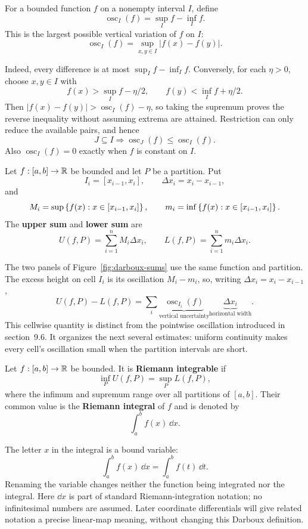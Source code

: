 \begin{definition}
For a bounded function $f$ on a nonempty interval $I$, define
\[
\operatorname{osc}_I(f)=\sup_I f-\inf_I f.
\]
This is the largest possible vertical variation of $f$ on $I$:
\[
\boxed{\operatorname{osc}_I(f)=\sup_{x,y\in I}|f(x)-f(y)|.}
\]
\end{definition}
Indeed, every difference is at most $\sup_I f-\inf_I f$. Conversely, for
each $\eta>0$, choose $x,y\in I$ with
\[
f(x)>\sup_I f-\eta/2,
\qquad
f(y)<\inf_I f+\eta/2.
\]
Then $|f(x)-f(y)|>\operatorname{osc}_I(f)-\eta$, so taking the supremum
proves the reverse inequality without assuming extrema are attained.
Restriction can only reduce the available pairs, and hence
\[
J\subseteq I\Longrightarrow\operatorname{osc}_J(f)
\leq\operatorname{osc}_I(f).
\]
Also $\operatorname{osc}_I(f)=0$ exactly when $f$ is constant on $I$.

\begin{definition}
Let $f:[a,b]\to\mathbb{R}$ be bounded and let $P$ be a partition. Put
\[
I_i=[x_{i-1},x_i],\qquad \Delta x_i=x_i-x_{i-1},
\]
and
\[
M_i=\sup\left\{f(x):x\in[x_{i-1},x_i]\right\},
\qquad
m_i=\inf\left\{f(x):x\in[x_{i-1},x_i]\right\}.
\]
The \textbf{upper sum} and \textbf{lower sum} are
\[
U(f,P)=\sum_{i=1}^{n}M_i\Delta x_i,
\qquad
L(f,P)=\sum_{i=1}^{n}m_i\Delta x_i.
\]
\end{definition}

The two panels of Figure~\ref{fig:darboux-sums} use the same function
and partition. The excess height on cell $I_i$ is its oscillation
$M_i-m_i$, so, writing $\Delta x_i=x_i-x_{i-1}$,
\[
\boxed{U(f,P)-L(f,P)=\sum_i
\underbrace{\operatorname{osc}_{I_i}(f)}_{\text{vertical uncertainty}}
\underbrace{\Delta x_i}_{\text{horizontal width}}.}
\]
This cellwise quantity is distinct from the pointwise oscillation introduced
in section~9.6. It organizes the next several estimates: uniform continuity
makes every cell's oscillation small when the partition intervals are short.


\begin{definition}
Let $f:[a,b]\to\mathbb{R}$ be bounded. It is \textbf{Riemann integrable} if
\[
\inf_P U(f,P)=\sup_P L(f,P),
\]
where the infimum and supremum range over all partitions of $[a,b]$. Their common value is the \textbf{Riemann integral} of $f$ and is denoted by
\[
\int_a^b f(x)\,\dd x.
\]
\end{definition}

\begin{remark}
The letter $x$ in the integral is a bound variable:
\[
\int_a^b f(x)\,\dd x=\int_a^b f(t)\,\dd t.
\]
Renaming the variable changes neither the function being integrated nor
the integral. Here $\dd x$ is part of standard Riemann-integration
notation; no infinitesimal numbers are assumed. Later coordinate
differentials will give related notation a precise linear-map meaning,
without changing this Darboux definition.
\end{remark}

